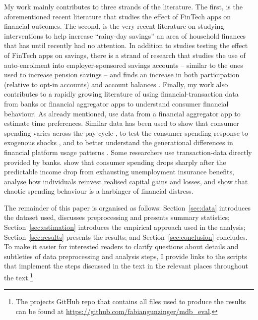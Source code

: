 My work mainly contributes to three strands of the literature. The first, is the
aforementioned recent literature that studies the effect of FinTech apps on
financial outcomes. The second, is the very recent literature on studying
interventions to help increase ``rainy-day savings'' an area of household
finances that has until recently had no attention. In addition to studies
testing the effect of FinTech apps on savings, there is a strand of research
that studies the use of auto-enrolment into employer-sponsored savings accounts
-- similar to the ones used to increase pension savings \citep{thaler2004save,
choi2004better, choukhmane2019default} -- and finds an increase in both
participation (relative to opt-in accounts) and account balances
\citep{beshears2020building, berk2022automating}. Finally, my work also
contributes to a rapidly growing literature of using financial-transaction data
from banks or financial aggregator apps to understand consumer financial
behaviour. As already mentioned, \citet{kuchler2020sticking} use data from a
financial aggregator app to estimate time preferences. Similar data has been
used to show that consumer spending varies across the pay cycle
\citep{gelman2014harnessing,olafsson2018liquid}, to test the consumer spending
response to exogenous shocks \citep{baker2018debt,baugh2014disentangling}, and
to better understand the generational differences in financial platform usage
patterns \citep{carlin2019generational}. Some researchers use transaction-data
directly provided by banks. \citet{ganong2019consumer} show that consumer
spending drops sharply after the predictable income drop from exhausting
unemployment insurance benefits, \citet{meyer2018fully} analyse how individuals
reinvest realised capital gains and losses, and \citet{muggleton2020evidence}
show that chaotic spending behaviour is a harbinger of financial distress.

The remainder of this paper is organised as follows: Section~\ref{sec:data}
introduces the dataset used, discusses preprocessing and presents summary
statistics; Section~\ref{sec:estimation} introduces the empirical approach used
in the analysis; Section~\ref{sec:results} presents the results; and
Section~\ref{sec:conclusion} concludes. To make it easier for interested
readers to clarify questions about details and subtleties of data preprocessing
and analysis steps, I provide links to the scripts that implement the steps
discussed in the text in the relevant places throughout the text.\footnote{The
    projects GitHub repo that contains all files used to produce the results
    can be found at
\href{https://github.com/fabiangunzinger/mdb\_eval}{https://github.com/fabiangunzinger/mdb\_eval}.}

